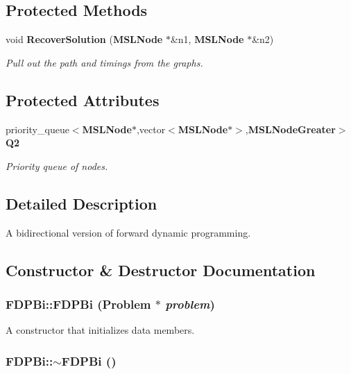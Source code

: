 \subsection*{Protected Methods}
\begin{CompactItemize}
\item 
void {\bf Recover\-Solution} ({\bf MSLNode} $\ast$\&n1, {\bf MSLNode} $\ast$\&n2)
\begin{CompactList}\small\item\em Pull out the path and timings from the graphs.\item\end{CompactList}\end{CompactItemize}
\subsection*{Protected Attributes}
\begin{CompactItemize}
\item 
priority\_\-queue$<${\bf MSLNode}$\ast$,vector$<${\bf MSLNode}$\ast$$>$,{\bf MSLNode\-Greater}$>$ {\bf Q2}
\begin{CompactList}\small\item\em Priority queue of nodes.\item\end{CompactList}\end{CompactItemize}


\subsection{Detailed Description}
A bidirectional version of forward dynamic programming.



\subsection{Constructor \& Destructor Documentation}
\subsubsection{\setlength{\rightskip}{0pt plus 5cm}FDPBi::FDPBi ({\bf Problem} $\ast$ {\em problem})}\label{classFDPBi_a0}


A constructor that initializes data members.

\subsubsection{\setlength{\rightskip}{0pt plus 5cm}FDPBi::$\sim$FDPBi ()\hspace{0.3cm}{\tt  [inline]}}\label{classFDPBi_a1}


